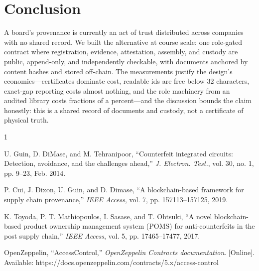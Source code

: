 \documentclass[conference]{IEEEtran}
\begin{document}
\section{Conclusion}
A board's provenance is currently an act of trust distributed across companies with no shared record. We built the alternative at course scale: one role-gated contract where registration, evidence, attestation, assembly, and custody are public, append-only, and independently checkable, with documents anchored by content hashes and stored off-chain. The measurements justify the design's economics---certificates dominate cost, readable ids are free below 32 characters, exact-gap reporting costs almost nothing, and the role machinery from an audited library costs fractions of a percent---and the discussion bounds the claim honestly: this is a shared record of documents and custody, not a certificate of physical truth.

\begin{thebibliography}{1}

U. Guin, D. DiMase, and M. Tehranipoor, ``Counterfeit integrated circuits: Detection, avoidance, and the challenges ahead,'' \emph{J. Electron. Test.}, vol. 30, no. 1, pp. 9--23, Feb. 2014.

P. Cui, J. Dixon, U. Guin, and D. Dimase, ``A blockchain-based framework for supply chain provenance,'' \emph{IEEE Access}, vol. 7, pp. 157113--157125, 2019.

K. Toyoda, P. T. Mathiopoulos, I. Sasase, and T. Ohtsuki, ``A novel blockchain-based product ownership management system (POMS) for anti-counterfeits in the post supply chain,'' \emph{IEEE Access}, vol. 5, pp. 17465--17477, 2017.

OpenZeppelin, ``AccessControl,'' \emph{OpenZeppelin Contracts documentation}. [Online]. Available: https://docs.openzeppelin.com/contracts/5.x/access-control

\end{thebibliography}
\end{document}
